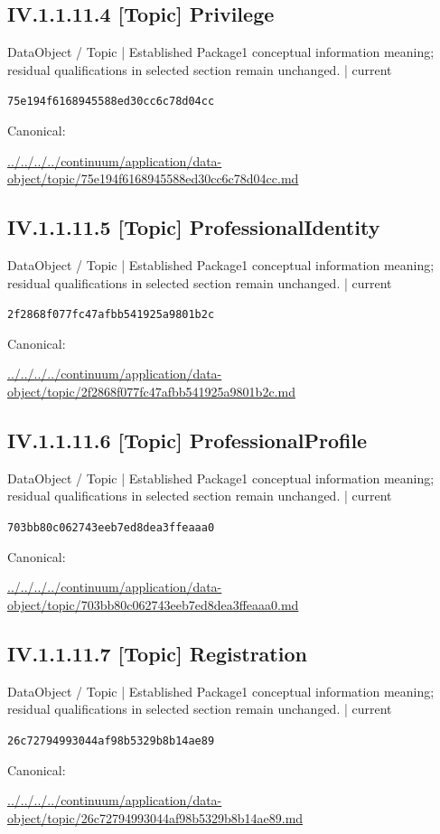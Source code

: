 \documentclass[10pt,a4paper]{article}
\begin{document}
\subsection*{IV.1.1.11.4 [Topic] Privilege}
\label{element-75e194f6168945588ed30cc6c78d04cc}
{\small DataObject / Topic | Established Package1 conceptual information meaning; residual qualifications in selected section remain unchanged. | current}\par
\texttt{75e194f6168945588ed30cc6c78d04cc}\par
Canonical: \par
{\footnotesize\url{../../../../continuum/application/data-object/topic/75e194f6168945588ed30cc6c78d04cc.md}}\par
\subsection*{IV.1.1.11.5 [Topic] ProfessionalIdentity}
\label{element-2f2868f077fc47afbb541925a9801b2c}
{\small DataObject / Topic | Established Package1 conceptual information meaning; residual qualifications in selected section remain unchanged. | current}\par
\texttt{2f2868f077fc47afbb541925a9801b2c}\par
Canonical: \par
{\footnotesize\url{../../../../continuum/application/data-object/topic/2f2868f077fc47afbb541925a9801b2c.md}}\par
\subsection*{IV.1.1.11.6 [Topic] ProfessionalProfile}
\label{element-703bb80c062743eeb7ed8dea3ffeaaa0}
{\small DataObject / Topic | Established Package1 conceptual information meaning; residual qualifications in selected section remain unchanged. | current}\par
\texttt{703bb80c062743eeb7ed8dea3ffeaaa0}\par
Canonical: \par
{\footnotesize\url{../../../../continuum/application/data-object/topic/703bb80c062743eeb7ed8dea3ffeaaa0.md}}\par
\subsection*{IV.1.1.11.7 [Topic] Registration}
\label{element-26c72794993044af98b5329b8b14ae89}
{\small DataObject / Topic | Established Package1 conceptual information meaning; residual qualifications in selected section remain unchanged. | current}\par
\texttt{26c72794993044af98b5329b8b14ae89}\par
Canonical: \par
{\footnotesize\url{../../../../continuum/application/data-object/topic/26c72794993044af98b5329b8b14ae89.md}}\par
\end{document}
